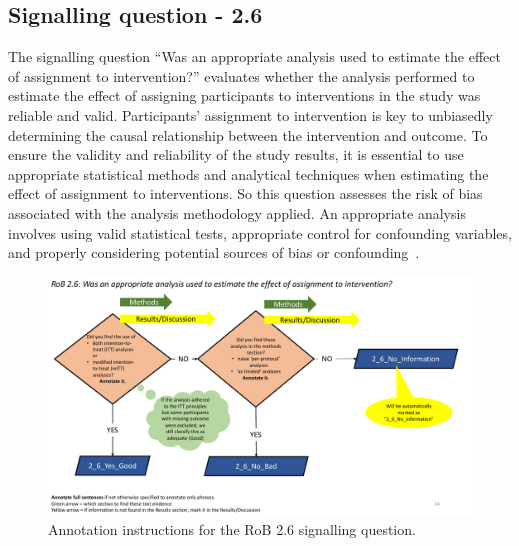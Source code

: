 \documentclass[sn-mathphys,Numbered]{sn-jnl}%
\begin{document}
\subsection*{Signalling question - 2.6 }
\label{subsec:2_6}
%
The signalling question ``Was an appropriate analysis used to estimate the effect of assignment to intervention?'' evaluates whether the analysis performed to estimate the effect of assigning participants to interventions in the study was reliable and valid.
Participants' assignment to intervention is key to unbiasedly determining the causal relationship between the intervention and outcome.
To ensure the validity and reliability of the study results, it is essential to use appropriate statistical methods and analytical techniques when estimating the effect of assignment to interventions.
So this question assesses the risk of bias associated with the analysis methodology applied. 
An appropriate analysis involves using valid statistical tests, appropriate control for confounding variables, and properly considering potential sources of bias or confounding~\cite{gupta2011intention}. 


%
%
%
\begin{figure}[hbt]
    \centering
    \includegraphics[width=\textwidth]{figures/2_6.pdf}
    \caption{Annotation instructions for the RoB 2.6 signalling question.}
    \label{fig:2_6}
\end{figure}
%
%
%
\end{document}

